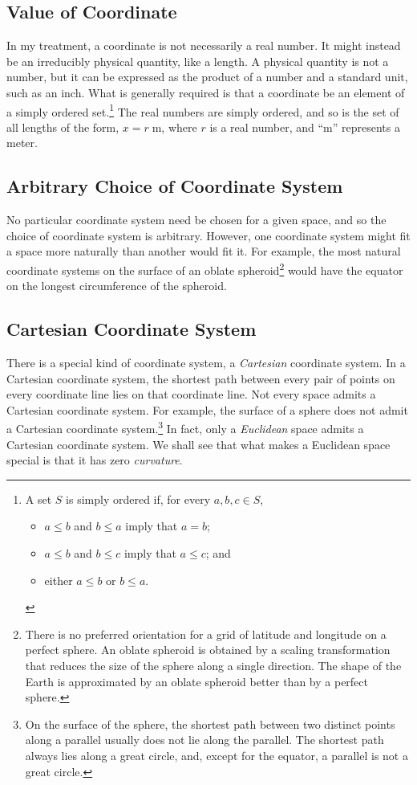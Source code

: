 \subsection{Value of Coordinate}

In my treatment, a coordinate is not necessarily a real number.  It might
instead be an irreducibly physical quantity, like a length.  A physical
quantity is not a number, but it can be expressed as the product of a number
and a standard unit, such as an inch.  What is generally required is that a
coordinate be an element of a simply ordered set.\footnote{%
   A set $S$ is simply ordered if, for every $a, b, c \in S$,
   \begin{itemize}[noitemsep]
      \item $a \leq b$ and $b \leq a$ imply that $a = b$;
      \item $a \leq b$ and $b \leq c$ imply that $a \leq c$; and
      \item either $a \leq b$ or $b \leq a$.
   \end{itemize}%
}
The real numbers are simply ordered, and so is the set of all lengths of the
form, $x = r \; \text{m}$, where $r$ is a real number, and ``$\text{m}$''
represents a meter.

\subsection{Arbitrary Choice of Coordinate System}

No particular coordinate system need be chosen for a given space, and so the
choice of coordinate system is arbitrary.  However, one coordinate system might
fit a space more naturally than another would fit it.  For example, the most
natural coordinate systems on the surface of an oblate
spheroid\footnote{%
   There is no preferred orientation for a grid of latitude and longitude on a
   perfect sphere.  An oblate spheroid is obtained by a scaling transformation
   that reduces the size of the sphere along a single direction.  The shape of
   the Earth is approximated by an oblate spheroid better than by a perfect
   sphere.%
}
would have the equator on the longest circumference of the spheroid.

\subsection{Cartesian Coordinate System}

There is a special kind of coordinate system, a \emph{Cartesian} coordinate
system.  In a Cartesian coordinate system, the shortest path between every pair
of points on every coordinate line lies on that coordinate line.  Not every
space admits a Cartesian coordinate system.  For example, the surface of a
sphere does not admit a Cartesian coordinate system.\footnote{%
   On the surface of the sphere, the shortest path between two distinct points
   along a parallel usually does not lie along the parallel.  The shortest path
   always lies along a great circle, and, except for the equator, a parallel is
   not a great circle.%
}
In fact, only a \emph{Euclidean} space admits a Cartesian coordinate system.
We shall see that what makes a Euclidean space special is that it has zero
\emph{curvature}.

